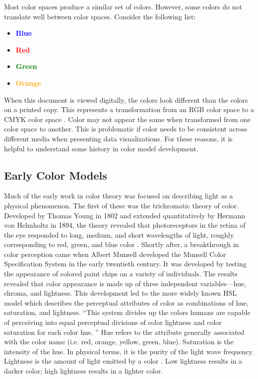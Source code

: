 \documentclass[journal,12pt]{IEEEtran}
\begin{document}
Most color spaces produce a similar set of colors. However, some colors
do not translate well between color spaces. Consider the following list:
\begin{itemize}
\item \textcolor{blue}{\textbf{Blue}}
\item \textcolor{red}{\textbf{Red}}
\item \textcolor{green}{\textbf{Green}}
\item \textcolor{orange}{\textbf{Orange}}
\end{itemize}
When this document is viewed digitally, the colors look
different than the colors on a printed copy. This represents
a transformation from an RGB color space to a CMYK color space \cite{colorvblackwhite}.
Color may not appear the same when transformed from one color space to another.
This is problematic if color needs to be consistent across
different media when presenting data visualizations.
For these reasons, it is helpful to understand some history in color model development.

\subsection{Early Color Models}

Much of the early work in color theory was focused on describing light as a physical phenomenon.
The first of these was the trichromatic theory of color. 
Developed by Thomas Young in 1802 and extended quantitatively by 
Hermann von Helmholtz in 1894, the theory revealed that photoreceptors
in the retina of the eye responded to long, medium, and short wavelengths of light, 
roughly corresponding to red, green, and blue color \cite{colorimetry}.
Shortly after, a breakthrough in color perception came when
Albert Munsell developed the Munsell Color Specification System in the early twentieth century.
It was developed by testing the appearance of colored paint chips on a variety of individuals.
The results revealed that color appearance is made up of
three independent variables---hue, chroma, and lightness.
This development led to the more
widely known HSL model which describes the perceptual attributes of color as combinations of hue,
saturation, and lightness\cite{colormapping,colorimetry}.
``This system
divides up the colors humans are capable of perceiving
into equal perceptual divisions of color lightness and
color saturation for each color hue. \cite{colormapping}''
Hue refers to the attribute generally associated with the color name (i.e. red,
orange, yellow, green, blue). Saturation is the intensity of the hue. In
physical terms, it is the purity of the light wave frequency. Lightness is the
amount of light emitted by a color \cite{colorguidelines}. Low lightness results in a darker color;
high lightness results in a lighter color.
\end{document}
